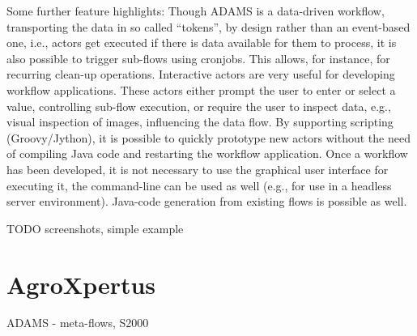 \documentclass{llncs}
\begin{document}
Some further feature highlights: Though ADAMS is a data-driven workflow,
transporting the data in so called “tokens”, by design rather than an
event-based one, i.e., actors get executed if there is data available for them
to process, it is also possible to trigger sub-flows using cronjobs.  This
allows, for instance, for recurring clean-up operations. Interactive actors are
very useful for developing workflow applications. These actors either prompt
the user to enter or select a value, controlling sub-flow execution, or require
the user to inspect data, e.g., visual inspection of images, influencing the
data flow. By supporting scripting (Groovy/Jython), it is possible to quickly
prototype new actors without the need of compiling Java code and restarting the
workflow application.  Once a workflow has been developed, it is not necessary
to use the graphical user interface for executing it, the command-line can be
used as well (e.g., for use in a headless server environment). Java-code
generation from existing flows is possible as well.

TODO screenshots, simple example


\section{AgroXpertus}
ADAMS - meta-flows, S2000

\end{document}
